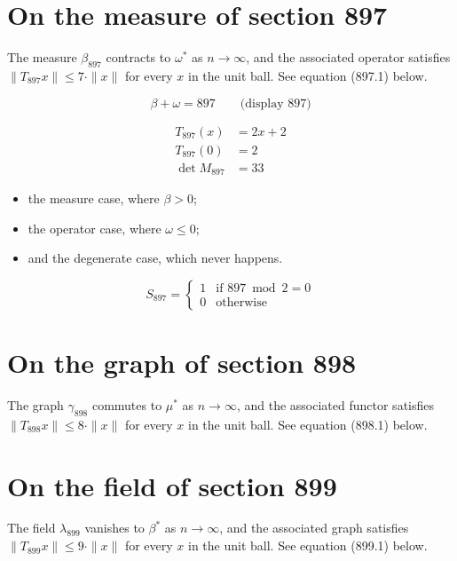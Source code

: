 \documentclass{article}
\begin{document}
\section{On the measure of section 897}
The measure $\beta_{897}$ contracts to $\omega^{*}$ as $n \to \infty$,
and the associated operator satisfies $\|T_{897} x\| \leq 7 \cdot \|x\|$
for every $x$ in the unit ball. See equation (897.1) below.

$$
\beta + \omega = 897 \qquad \text{(display 897)}
$$

\begin{align}
T_{897}(x) &= 2 x + 2 \\
T_{897}(0) &= 2 \\
\det M_{897} &= 33
\end{align}

\begin{itemize}
  \item the measure case, where $\beta > 0$;
  \item the operator case, where $\omega \leq 0$;
  \item and the degenerate case, which never happens.
\end{itemize}

\begin{equation}
S_{897} = \begin{cases} 1 & \text{if } 897 \bmod 2 = 0 \\ 0 & \text{otherwise} \end{cases}
\end{equation}

\section{On the graph of section 898}
The graph $\gamma_{898}$ commutes to $\mu^{*}$ as $n \to \infty$,
and the associated functor satisfies $\|T_{898} x\| \leq 8 \cdot \|x\|$
for every $x$ in the unit ball. See equation (898.1) below.

\section{On the field of section 899}
The field $\lambda_{899}$ vanishes to $\beta^{*}$ as $n \to \infty$,
and the associated graph satisfies $\|T_{899} x\| \leq 9 \cdot \|x\|$
for every $x$ in the unit ball. See equation (899.1) below.
\end{document}
